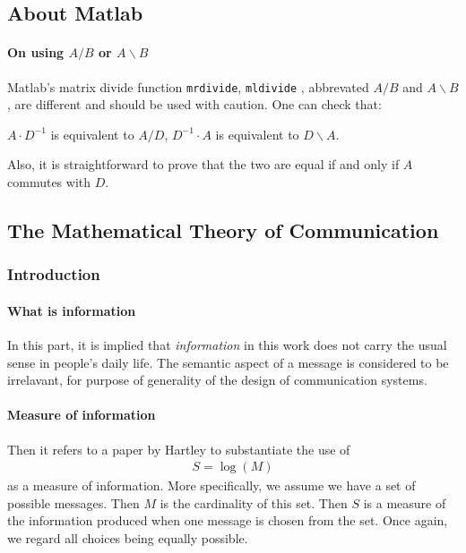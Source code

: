 \subsection{About Matlab}
\label{sec:About-Matlab}
\paragraph{On using $A/B$ or $A\backslash B$}
Matlab's matrix divide function \texttt{mrdivide}, \texttt{mldivide} ,
abbrevated $A/B$ and $A\backslash B$, are different and should be used
with caution. One can check that:
\begin{center}
    $A\cdot D^{-1}$ is equivalent to $A/D$, $D^{-1}\cdot A$ is
    equivalent to $D\backslash A$.
\end{center}
Also, it is straightforward to prove that the two are equal if and only if $A$ commutes with $D$.

\subsection{The Mathematical Theory of Communication}
\label{sec:The_Mathematical_Theory_of_Communication}
\subsubsection{Introduction}

\paragraph{What is information}
In this part, it is implied that \textit{information} in this work
does not carry the usual sense in people's daily life. The semantic
aspect of a message is considered to be irrelavant, for purpose
of generality of the design of communication systems.

\paragraph{Measure of information} 

Then it refers to a paper by Hartley to substantiate the use of
\begin{align}
\label{eq:measure_of_information}
S = \log(M)
\end{align}
as a measure of information. More specifically, we assume we have a
set of possible messages. Then $M$ is the cardinality of this set.
Then $S$ is a measure of the information produced when one message
is chosen from the set. Once again, we regard all choices 
being equally possible.

